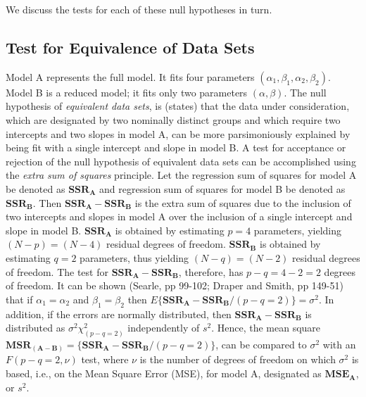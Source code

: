 \documentclass[11pt, oneside]{article}   	%
\begin{document}
\vspace{2 mm}

We discuss the tests for each of these null hypotheses in turn.     


\subsection{Test for Equivalence of Data Sets} 
Model A represents the full model. It fits four parameters $  (\alpha_{1}, \beta_{1}, \alpha_{2}, \beta_{2}) $. Model B is a reduced model; it fits only two parameters $  (\alpha,  \beta) $. The null hypothesis  of \emph{equivalent data sets}, is (states) that the data under consideration, which are designated by two nominally distinct groups and which require two intercepts and two slopes in model A, can be more parsimoniously explained by being fit with a single intercept and slope in model B. A test for acceptance or rejection of the null hypothesis of equivalent data sets can be accomplished using the \emph{extra sum of squares} principle. Let the regression sum of squares for model A be denoted as $ \mathbf{SSR_{A}} $ and regression sum of squares for model B be denoted as $ \mathbf{SSR_{B}} $.  Then $ \mathbf{SSR_{A}} -  \mathbf{SSR_{B}} $ is the extra sum of squares due to the inclusion of two intercepts and slopes in model A over the inclusion of a single intercept and slope in model B. $ \mathbf{SSR_{A}} $ is obtained by estimating $ p = 4 $ parameters, yielding $ (N - p)  = (N - 4) $ residual degrees of freedom.  $  \mathbf{SSR_{B}} $ is obtained by estimating $ q = 2 $ parameters, thus yielding $  (N - q) = (N - 2)  $ residual degrees of freedom.  The test for $ \mathbf{SSR_{A}} -  \mathbf{SSR_{B}} $, therefore,  has $  p - q = 4 - 2 = 2  $ degrees of freedom.  It can be shown (Searle, pp 99-102; Draper and Smith, pp 149-51) that if $ \alpha_{1} = \alpha_{2} $    and  $  \beta_{1} = \beta_{2}   $ then $ E\{  \mathbf{SSR_{A}} -  \mathbf{SSR_{B}}   / (p - q = 2) \} = \sigma^{2} $.  In addition, if the errors are normally distributed, then $ \mathbf{SSR_{A}} -  \mathbf{SSR_{B}} $ is distributed as  $ \sigma^{2} \chi^{2}_{(p-q=2)}  $ independently of $ s^{2}  $.  Hence, the mean square $ \mathbf{MSR_{(A-B)}}  =  \{  \mathbf{SSR_{A}} -  \mathbf{SSR_{B}}   / (p - q = 2) \} $, can be compared to $ \sigma^{2} $ with an $ F (p-q =2, \nu) $ test, where $ \nu $ is the number of degrees of freedom on which $ \sigma^{2} $ is based, i.e., on the Mean Square Error (MSE), for model A, designated as $ \mathbf{MSE_{A}} $, or $  s^2 $.  
\end{document}

